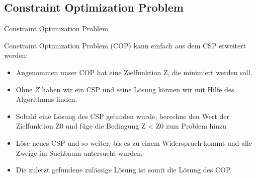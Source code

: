 \documentclass[hyperref={pdfpagelabels=false}]{beamer}
\begin{document}
\subsection{Constraint Optimization Problem}
\begin{frame}{Constraint Optimization Problem}

	{\color{darkred} Constraint Optimization Problem} ({\color{darkred}COP}) kann einfach aus dem CSP erweitert werden:
	\begin{itemize}
	\item Angenommen unser COP hat eine Zielfunktion Z, die minimiert werden soll. 
	
	\item Ohne $Z$ haben wir ein CSP und seine Lösung können wir
	mit Hilfe des Algorithmus finden.
	
	\pause
	
	\item Sobald eine Lösung des CSP
	gefunden wurde, berechne den Wert der Zielfunktion Z0 und füge die Bedingung Z < Z0 zum Problem hinzu 
	
	\item Löse neues CSP und so weiter, bis es zu einem Widerspruch kommt und alle Zweige
	im Suchbaum untersucht wurden.
	\pause
	\item Die zuletzt gefundene zulässige Lösung ist somit die Lösung des COP.
	\end{itemize}
\end{frame}
\end{document}
